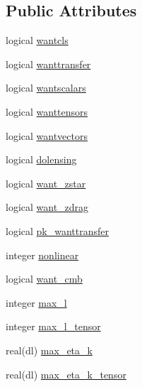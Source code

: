 \subsection*{Public Attributes}
\begin{DoxyCompactItemize}
\item 
logical \mbox{\hyperlink{structmodelparams_1_1cambparams_ab7c5c8d915fe8f413fadfe861ad3b5f1}{wantcls}}
\item 
logical \mbox{\hyperlink{structmodelparams_1_1cambparams_ab466a34e4ae30e3c9f1fbd6f1d49c660}{wanttransfer}}
\item 
logical \mbox{\hyperlink{structmodelparams_1_1cambparams_a772cd7275528d3cf12a33b64045bf754}{wantscalars}}
\item 
logical \mbox{\hyperlink{structmodelparams_1_1cambparams_a2be5b923dfc7af3742540ace72222442}{wanttensors}}
\item 
logical \mbox{\hyperlink{structmodelparams_1_1cambparams_ac57680a9b05aa3cde76cce41952a97cd}{wantvectors}}
\item 
logical \mbox{\hyperlink{structmodelparams_1_1cambparams_aca673235e683887da98c27e7996e6c1c}{dolensing}}
\item 
logical \mbox{\hyperlink{structmodelparams_1_1cambparams_a02f5b53bd072cf2da0c8b7783cf163f5}{want\+\_\+zstar}}
\item 
logical \mbox{\hyperlink{structmodelparams_1_1cambparams_acf3064b0e10908bd0bf2ed08126f3ece}{want\+\_\+zdrag}}
\item 
logical \mbox{\hyperlink{structmodelparams_1_1cambparams_a0842ab1629f2b8b79dc0bbbb2e190902}{pk\+\_\+wanttransfer}}
\item 
integer \mbox{\hyperlink{structmodelparams_1_1cambparams_a0722e323f8e18db15cab01b8dfbde3b4}{nonlinear}}
\item 
logical \mbox{\hyperlink{structmodelparams_1_1cambparams_a610874532a9376a00bae0714f14ca9cc}{want\+\_\+cmb}}
\item 
integer \mbox{\hyperlink{structmodelparams_1_1cambparams_a57d5797b322e4240fe24f7f9ec833fb2}{max\+\_\+l}}
\item 
integer \mbox{\hyperlink{structmodelparams_1_1cambparams_afd1536b769aa9ff98e2134acbc49f1df}{max\+\_\+l\+\_\+tensor}}
\item 
real(dl) \mbox{\hyperlink{structmodelparams_1_1cambparams_a24283be03af1ca25149d64b371757128}{max\+\_\+eta\+\_\+k}}
\item 
real(dl) \mbox{\hyperlink{structmodelparams_1_1cambparams_a430e5353dd812333da7786c1f84fcde1}{max\+\_\+eta\+\_\+k\+\_\+tensor}}

\end{DoxyCompactItemize}
